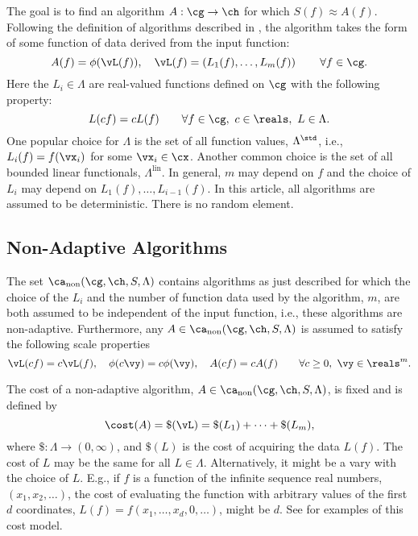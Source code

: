 \documentclass[final]{elsarticle}
\DeclareMathOperator{\lin}{lin}
\theoremstyle{definition}
\theoremstyle{remark}
\DeclareMathOperator{\fix}{non}
\begin{document}
The goal is to find an algorithm $A:\cg \to \ch$ for which $S(f) \approx A(f)$. Following the definition of algorithms described in \cite[Section 3.2]{TraWasWoz88}, the algorithm takes the form of some function of data derived from the input function:
\begin{equation}
\label{algoform}
A(f) =  \phi(\vL(f)), \quad \vL(f) = \left(L_1(f), \ldots, L_m(f)\right) \qquad \forall f \in \cg.
\end{equation}
Here the $L_i \in \Lambda$ are real-valued functions defined on $\cg$ with the following property:
\begin{equation}
\label{dataassump}
L(cf) = cL(f) \qquad \forall f \in \cg, \ c \in \reals, \ L \in \Lambda.
\end{equation}
One popular choice for $\Lambda$ is the set of all function values, $\Lambda^{\std}$, i.e., $L_i(f) = f(\vx_i)$ for some $\vx_i \in \cx$.  Another common choice is the set of all bounded linear functionals, $\Lambda^{\lin}$.  In general, $m$ may depend on $f$ and the choice of $L_i$ may depend on $L_1(f), \ldots, L_{i-1}(f)$.  In this article, all algorithms are assumed to be deterministic.  There is no random element.

\subsection{Non-Adaptive Algorithms}

The set $\ca_{\fix}(\cg,\ch,S,\Lambda)$ contains algorithms as just described for which the choice of the $L_i$ and the number of function data used by the algorithm, $m$, are both assumed to be independent of the input function, i.e., these algorithms are non-adaptive.  Furthermore, any $A \in \ca_{\fix}(\cg,\ch,S,\Lambda)$ is assumed to satisfy the following scale properties
\begin{equation}
\label{algoscale}
\vL(cf) = c \vL(f), \quad 
\phi(c\vy) = c\phi(\vy), \quad A(cf) = cA(f) \qquad \forall c \ge 0, \ \vy \in \reals^m.
\end{equation}

The cost of a non-adaptive algorithm, $A \in  \ca_{\fix}(\cg,\ch,S,\Lambda)$, is fixed and is defined by
\begin{equation} \label{costfix}
\cost(A) = \$(\vL) = \$(L_1) + \cdots +\$(L_m),
\end{equation}
where $\$:\Lambda \to (0,\infty)$, and $\$(L)$ is the cost of acquiring the data $L(f)$. The cost of $L$ may be the same for all $L \in \Lambda$.  Alternatively, it might be a vary with the choice of $L$.  E.g., if $f$ is a function of the infinite sequence real numbers, $(x_1, x_2, \ldots)$, the cost of evaluating the function with arbitrary values of the first $d$ coordinates, $L(f)=f(x_1, \ldots, x_d, 0, \ldots)$, might be $d$.  See \cite{???} for examples of this cost model.
\end{document}
